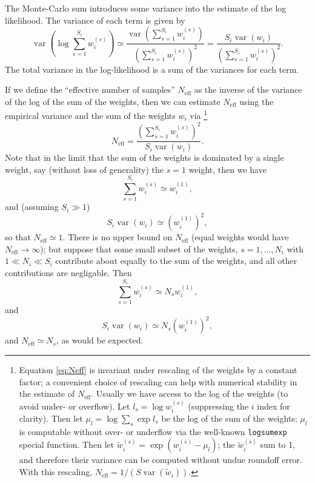 \documentclass[modern]{aastex631}
\newcommand{\Neff}{N_{\mathrm{eff}}}
\DeclareMathOperator{\var}{var}
\begin{document}
The Monte-Carlo sum introduces some variance into the estimate of the log
likelihood.  The variance of each term is given by 
\begin{equation}
    \var \left( \log \sum_{s=1}^{S_i} w_i^{(s)} \right) \simeq \frac{\var\left( \sum_{s=1}^{S_i} w_i^{(s)} \right)}{\left( \sum_{s=1}^{S_i} w_i^{(s)} \right)^2} = \frac{S_i \var\left( w_i \right)}{\left( \sum_{s=1}^{S_i} w_i^{(s)} \right)^2}.
\end{equation}
The total variance in the log-likelihood is a sum of the variances for each
term.

If we define the ``effective number of samples'' $\Neff$ as the inverse of the
variance of the log of the sum of the weights, then we can estimate $\Neff$
using the empirical variance and the sum of the weights $w_i$ via%
\footnote{Equation \eqref{eq:Neff} is invariant under rescaling of the weights
by a constant factor; a convenient choice of rescaling can help with numerical
stability in the estimate of $\Neff$.  Usually we have access to the log of the
weights (to avoid under- or overflow).  Let $l_s = \log w_i^{(s)}$ (suppressing
the $i$ index for clarity).  Then let $\mu_l = \log \sum_s \exp l_s$ be the log
of the sum of the weights; $\mu_l$ is computable without over- or underflow via
the well-known \texttt{logsumexp} special function.  Then let $\tilde{w}_i^{(s)}
= \exp\left( w_i^{(s)} - \mu_l \right)$; the $\tilde{w}_i^{(s)}$ sum to 1, and
therefore their variance can be computed without undue roundoff error.  With
this rescaling, $\Neff = 1 / \left( S \var\left( \tilde{w}_i \right) \right)$.}%
\begin{equation}
    \label{eq:Neff}
    \Neff = \frac{\left( \sum_{s=1}^{S_i} w_i^{(s)} \right)^2}{S_i \var\left( w_i \right)}.
\end{equation}
Note that in the limit that the sum of the weights is dominated by a single
weight, say (without loss of generality) the $s = 1$ weight, then we have 
\begin{equation}
    \sum_{s=1}^{S_i} w_i^{(s)} \simeq w_i^{(1)},
\end{equation}
and (assuming $S_i \gg 1$) 
\begin{equation}
    S_i \var\left( w_i \right) \simeq \left( w_i^{(1)} \right)^2,    
\end{equation}
so that $\Neff \simeq 1$.  There is no upper bound on $\Neff$ (equal weights
would have $\Neff \to \infty$); but suppose that some small subset of the
weights, $s = 1, \ldots, N_i$ with $1 \ll N_i \ll S_i$ contribute about equally
to the sum of the weights, and all other contributions are negligable.  Then 
\begin{equation}
    \sum_{s=1}^{S_i} w_i^{(s)} \simeq N_s w_i^{(1)},
\end{equation}
and 
\begin{equation}
    S_i \var\left( w_i \right) \simeq N_s \left( w_i^{(1)} \right)^2,
\end{equation}
and $\Neff \simeq N_s$, as would be expected.
\end{document}
